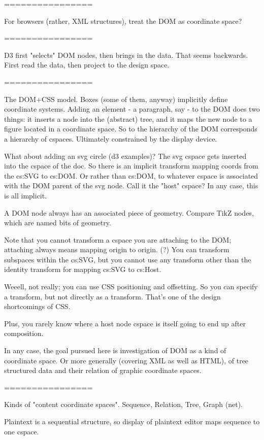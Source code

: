\documentclass{tufte-handout}
\numberwithin{equation}{subsection}
\begin{document}
================

For browsers (rather, XML structures), treat the DOM as coordinate
space?

================

D3 first "selects" DOM nodes, then brings in the data.  That seems
backwards.  First read the data, then project to the design space.

================

The DOM+CSS model.  Boxes (some of them, anyway) implicitly define
coordinate systems.  Adding an element - a paragraph, say - to the DOM
does two things: it inserts a node into the (abstract) tree, and it
maps the new node to a figure located in a coordinate space.  So to
the hierarchy of the DOM corresponds a hierarchy of cspaces.
Ultimately constrained by the display device.

What about adding an svg circle (d3 examples)?  The svg cspace gets
inserted into the cspace of the doc.  So there is an implicit
transform mapping coords from the cs:SVG to cs:DOM. Or rather than
cs:DOM, to whatever cspace is associated with the DOM parent of the
svg node.  Call it the "host" cspace?  In any case, this is all
implicit.

A DOM node always has an associated piece of geometry.  Compare TikZ
nodes, which are named bits of geometry.

Note that you cannot transform a cspace you are attaching to the DOM;
attaching always means mapping origin to origin. (?)  You can
transform subspaces within the cs:SVG, but you cannot use any
transform other than the identity transform for mapping cs:SVG to
cs:Host.

Weeell, not really; you can use CSS positioning and offsetting.  So
you can specify a transform, but not directly as a transform.  That's
one of the design shortcomings of CSS.

Plus, you rarely know where a host node cspace is itself going to end
up after composition.

In any case, the goal pursued here is investigation of DOM as a kind
of coordinate space.  Or more generally (covering XML as well as
HTML), of tree structured data and their relation of graphic
coordinate spaces.


================

Kinds of "content coordinate spaces".  Sequence, Relation, Tree, Graph
(net).  

Plaintext is a sequential structure, so display of plaintext editor
maps sequence to one cspace.
\end{document}
